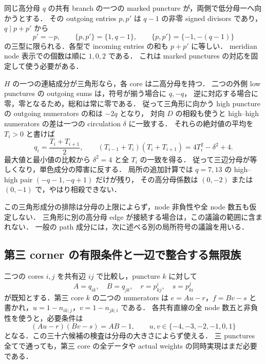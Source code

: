同じ高分母 $q$ の共有 branch の一つの marked puncture が，両側で低分母一へ向かうとする．
その outgoing entries $p,p'$ は $q-1$ の非零 signed divisors であり，
$q\mid p+p'$ から
\[
 p'=-p,\qquad\{p,p'\}=\{1,q-1\},\qquad
 \{p,p'\}=\{-1,-(q-1)\}
\]
の三型に限られる．各型で incoming entries の和も $p+p'$ に等しい．
meridian node 表示での個数は順に $1,0,2$ である．
これは marked punctures の対応を固定して使う必要がある．

$H$ の一つの連結成分が三角形なら，各 core は二高分母を持つ．
二つの外側 low punctures の outgoing sums は，符号が揃う場合に $q,-q$，
逆に対応する場合に零，零となるため，総和は常に零である．
従って三角形に向かう high puncture の outgoing numerators の和は $-2q$ となり，
対向 $D$ の相殺も使うと high--high numerators の差は一つの circulation $\delta$ に一致する．
それらの絶対値の平均を $T_i>0$ と書けば
\[
 q_i=\frac{T_i+T_{i+1}}2,\qquad
 (T_{i-1}+T_i)(T_i+T_{i+1})=4T_i^2-\delta^2+4.
\]
最大値と最小値の比較から $\delta^2=4$ と全 $T_i$ の一致を得る．
従って三辺分母が等しくなり，単色成分の障害に反する．
局所の追加計算では $q=7,13$ の high--high pair $(-q-1,-q+1)$ だけが残り，
その高分母係数は $(0,-2)$ または $(0,-1)$ で，やはり相殺できない．

この三角形成分の排除は分母の上限によらず，node 非負性や全 node 数五も仮定しない．
三角形に別の高分母 edge が接続する場合は，この議論の範囲に含まれない．
一般の path 成分には，次に述べる別の局所符号の議論を用いる．




\subsection{第三 corner の有限条件と一辺で整合する無限族}

二つの cores $i,j$ を共有辺 $ij$ で比較し，puncture $k$ に対して
\[
 A=q_{ik},\quad B=q_{jk},\quad r=p^i_{kj},\quad s=p^j_{ki}
\]
が既知とする．第三 core $k$ の二つの numerators は
$e=Au-r$，$f=Bv-s$ と書かれ，$u=1-n_{ik;j}$，$v=1-n_{jk;i}$ である．
各共有直線の全 node 数五と非負性を使うと，必要条件は
\[
 (Au-r)(Bv-s)=AB-1,
 \qquad u,v\in\{-4,-3,-2,-1,0,1\}
\]
となる．この三十六候補の検査は分母の大きさによらず使える．
三 punctures 全てで通っても，第三 core の全データや actual weights の同時実現はまだ必要である．

